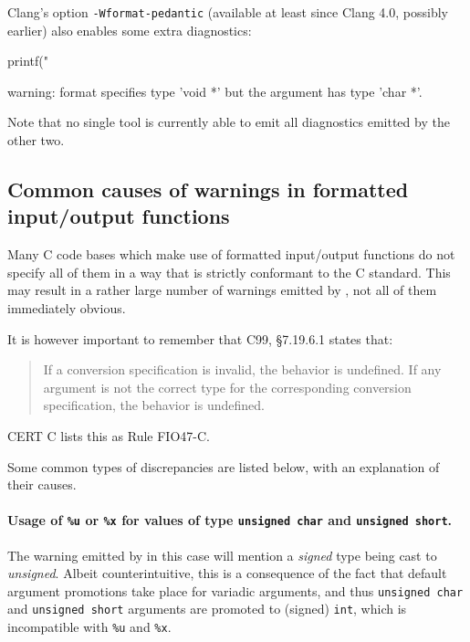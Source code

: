 Clang's option \verb+-Wformat-pedantic+ (available at least since Clang 4.0,
possibly earlier) also enables some extra diagnostics:

\begin{ccode}
  printf("%
\end{ccode}

\begin{shell}
  warning: format specifies type 'void *' but the argument has type 'char *'.
\end{shell}

Note that no single tool is currently able to emit all diagnostics emitted
by the other two.

\subsection{Common causes of warnings in formatted input/output functions}

Many C code bases which make use of formatted input/output functions do not
specify all of them in a way that is strictly conformant to the C standard.
This may result in a rather large number of warnings emitted by
, not all of them immediately obvious.

It is however important to remember that C99, §7.19.6.1 states that:

\begin{quote}
  If a conversion specification is invalid, the behavior is undefined.
  If any argument is not the correct type for the corresponding conversion
  specification, the behavior is undefined.
\end{quote}

CERT C lists this as Rule FIO47-C.

Some common types of discrepancies are listed below, with an explanation
of their causes.

\paragraph{Usage of \texttt{\%u} or \texttt{\%x} for values of type
  \texttt{unsigned char} and \texttt{unsigned short}.}

The warning emitted by  in this case will mention a
{\em signed} type being cast to {\em unsigned}.
Albeit counterintuitive, this is a consequence of the fact that default
argument promotions take place for variadic arguments, and thus
\verb+unsigned char+ and \verb+unsigned short+ arguments are promoted to
(signed) \verb+int+, which is incompatible with \verb+%u+ and \verb+%x+.

